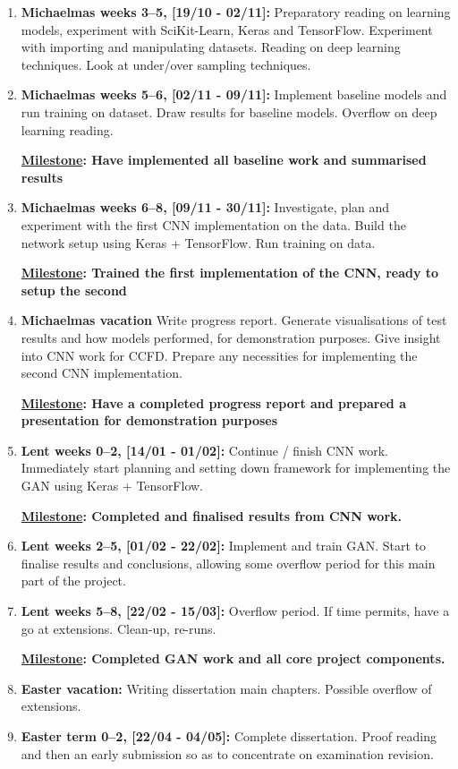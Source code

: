 \documentclass[12pt,a4paper,twoside]{article}
\begin{document}
\begin{enumerate}

\item \textbf{Michaelmas weeks 3--5, [19/10 - 02/11]:} Preparatory reading on learning models, experiment with SciKit-Learn, Keras and TensorFlow. Experiment with importing and manipulating datasets. Reading on deep learning techniques. Look at under/over sampling techniques.

\item \textbf{Michaelmas weeks 5--6, [02/11 - 09/11]:} Implement baseline models and run training on dataset. Draw results for baseline models. Overflow on deep learning reading.

\textbf{\underline{Milestone}: Have implemented all baseline work and summarised results}

\item \textbf{Michaelmas weeks 6--8, [09/11 - 30/11]:} Investigate, plan and experiment with the first CNN implementation on the data. Build the network setup using Keras + TensorFlow. Run training on data.

\textbf{\underline{Milestone}: Trained the first implementation of the CNN, ready to setup the second}

\item \textbf{Michaelmas vacation} Write progress report. Generate visualisations of test results and how models performed, for demonstration purposes. Give insight into CNN work for CCFD. Prepare any necessities for implementing the second CNN implementation.

\textbf{\underline{Milestone}: Have a completed progress report and prepared a presentation for demonstration purposes}

\item \textbf{Lent weeks 0--2, [14/01 - 01/02]:} Continue / finish CNN work. Immediately start planning and setting down framework for implementing the GAN using Keras + TensorFlow.

\textbf{\underline{Milestone}: Completed and finalised results from CNN work.}

\item \textbf{Lent weeks 2--5, [01/02 - 22/02]:} Implement and train GAN. Start to finalise results and conclusions, allowing some overflow period for this main part of the project.

\item \textbf{Lent weeks 5--8, [22/02 - 15/03]:} Overflow period. If time permits, have a go at extensions. Clean-up, re-runs.

\textbf{\underline{Milestone}: Completed GAN work and all core project components.}

\item \textbf{Easter vacation:} Writing dissertation main chapters. Possible overflow of extensions.

\item \textbf{Easter term 0--2, [22/04 - 04/05]:}  Complete dissertation. Proof reading and then an early submission
  so as to concentrate on examination revision.

\end{enumerate}



\end{document}
